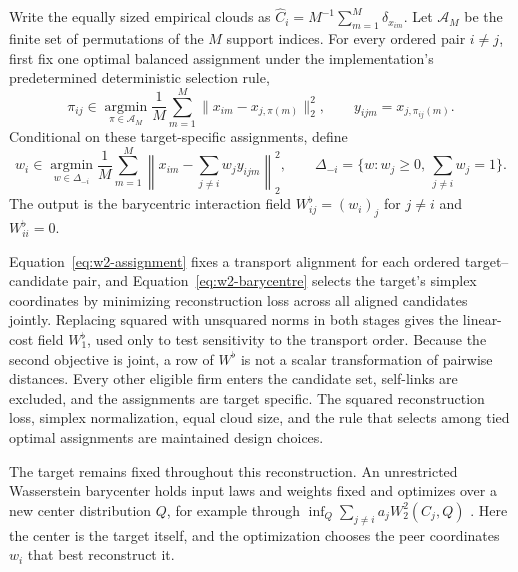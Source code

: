\begin{definition}
  \label{def:w-flat}
  Write the equally sized empirical clouds as
  $\widehat C_i=M^{-1}\sum_{m=1}^M\delta_{x_{im}}$.
  Let $\mathcal A_M$ be the finite set of permutations of the $M$ support
  indices.
  For every ordered pair $i\ne j$, first fix one optimal balanced assignment
  under the implementation's predetermined deterministic selection rule,
  \begin{equation}\label{eq:w2-assignment}
    \pi_{ij}\in\operatorname*{argmin}_{\pi\in\mathcal A_M}
    \frac{1}{M}\sum_{m=1}^M
    \lVert x_{im}-x_{j,\pi(m)}\rVert_2^2,
    \qquad y_{ijm}=x_{j,\pi_{ij}(m)}.
  \end{equation}
  Conditional on these target-specific assignments, define
  \begin{equation}\label{eq:w2-barycentre}
    w_i\in\operatorname*{argmin}_{w\in\Delta_{-i}}
    \frac{1}{M}\sum_{m=1}^M
    \left\lVert x_{im}-\sum_{j\ne i}w_j y_{ijm}\right\rVert_2^2,
    \qquad
    \Delta_{-i}=\{w:w_j\geq0,\ \sum_{j\ne i}w_j=1\}.
  \end{equation}
  The output is the barycentric interaction field
  $W^\flat_{ij}=(w_i)_j$ for $j\ne i$ and $W^\flat_{ii}=0$.
\end{definition}

Equation~\eqref{eq:w2-assignment} fixes a transport alignment for each ordered
target--candidate pair, and Equation~\eqref{eq:w2-barycentre} selects the
target's simplex coordinates by minimizing reconstruction loss across all
aligned candidates jointly.
Replacing squared with unsquared norms in both stages gives the linear-cost
field $W^\flat_1$, used only to test sensitivity to the transport order.
Because the second objective is joint, a row of $W^\flat$ is not a scalar
transformation of pairwise distances.
Every other eligible firm enters the candidate set, self-links are excluded,
and the assignments are target specific.
The squared reconstruction loss, simplex normalization, equal cloud size, and
the rule that selects among tied optimal assignments are maintained design
choices.

The target remains fixed throughout this reconstruction.
An unrestricted Wasserstein barycenter holds input laws and weights fixed and
optimizes over a new center distribution $Q$, for example through
$\inf_Q\sum_{j\ne i}a_j W_2^2(C_j,Q)$
\citep{agueh_carlier_barycenters_2011}.
Here the center is the target itself, and the optimization chooses the peer
coordinates $w_i$ that best reconstruct it.

